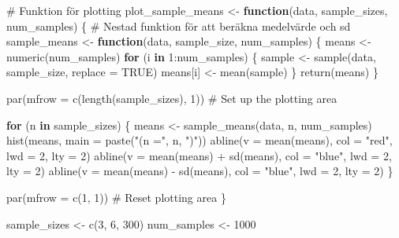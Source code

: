 \documentclass[
  letterpaper,
  DIV=11,
  numbers=noendperiod]{scrartcl}
\newenvironment{Shaded}{\begin{snugshade}}{\end{snugshade}}
\newcommand{\AttributeTok}[1]{\textcolor[rgb]{0.40,0.45,0.13}{#1}}
\newcommand{\CommentTok}[1]{\textcolor[rgb]{0.37,0.37,0.37}{#1}}
\newcommand{\ConstantTok}[1]{\textcolor[rgb]{0.56,0.35,0.01}{#1}}
\newcommand{\ControlFlowTok}[1]{\textcolor[rgb]{0.00,0.23,0.31}{\textbf{#1}}}
\newcommand{\DecValTok}[1]{\textcolor[rgb]{0.68,0.00,0.00}{#1}}
\newcommand{\FunctionTok}[1]{\textcolor[rgb]{0.28,0.35,0.67}{#1}}
\newcommand{\NormalTok}[1]{\textcolor[rgb]{0.00,0.23,0.31}{#1}}
\newcommand{\OtherTok}[1]{\textcolor[rgb]{0.00,0.23,0.31}{#1}}
\newcommand{\SpecialCharTok}[1]{\textcolor[rgb]{0.37,0.37,0.37}{#1}}
\newcommand{\StringTok}[1]{\textcolor[rgb]{0.13,0.47,0.30}{#1}}
\begin{document}
\begin{Shaded}
\begin{Highlighting}[]
\CommentTok{\# Funktion för plotting}
\NormalTok{plot\_sample\_means }\OtherTok{\textless{}{-}} \ControlFlowTok{function}\NormalTok{(data, sample\_sizes, num\_samples) \{}
  \CommentTok{\# Nestad funktion för att beräkna medelvärde och sd}
\NormalTok{  sample\_means }\OtherTok{\textless{}{-}} \ControlFlowTok{function}\NormalTok{(data, sample\_size, num\_samples) \{}
\NormalTok{    means }\OtherTok{\textless{}{-}} \FunctionTok{numeric}\NormalTok{(num\_samples)}
    \ControlFlowTok{for}\NormalTok{ (i }\ControlFlowTok{in} \DecValTok{1}\SpecialCharTok{:}\NormalTok{num\_samples) \{}
\NormalTok{      sample }\OtherTok{\textless{}{-}} \FunctionTok{sample}\NormalTok{(data, sample\_size, }\AttributeTok{replace =} \ConstantTok{TRUE}\NormalTok{)}
\NormalTok{      means[i] }\OtherTok{\textless{}{-}} \FunctionTok{mean}\NormalTok{(sample)}
\NormalTok{    \}}
    \FunctionTok{return}\NormalTok{(means)}
\NormalTok{  \}}
  
  \FunctionTok{par}\NormalTok{(}\AttributeTok{mfrow =} \FunctionTok{c}\NormalTok{(}\FunctionTok{length}\NormalTok{(sample\_sizes), }\DecValTok{1}\NormalTok{))  }\CommentTok{\# Set up the plotting area}
  
  \ControlFlowTok{for}\NormalTok{ (n }\ControlFlowTok{in}\NormalTok{ sample\_sizes) \{}
\NormalTok{    means }\OtherTok{\textless{}{-}} \FunctionTok{sample\_means}\NormalTok{(data, n, num\_samples)}
    \FunctionTok{hist}\NormalTok{(means, }\AttributeTok{main =} \FunctionTok{paste}\NormalTok{(}\StringTok{"(n ="}\NormalTok{, n, }\StringTok{")"}\NormalTok{))}
    \FunctionTok{abline}\NormalTok{(}\AttributeTok{v =} \FunctionTok{mean}\NormalTok{(means), }\AttributeTok{col =} \StringTok{"red"}\NormalTok{, }\AttributeTok{lwd =} \DecValTok{2}\NormalTok{, }\AttributeTok{lty =} \DecValTok{2}\NormalTok{)}
    \FunctionTok{abline}\NormalTok{(}\AttributeTok{v =} \FunctionTok{mean}\NormalTok{(means) }\SpecialCharTok{+} \FunctionTok{sd}\NormalTok{(means), }\AttributeTok{col =} \StringTok{"blue"}\NormalTok{, }\AttributeTok{lwd =} \DecValTok{2}\NormalTok{, }\AttributeTok{lty =} \DecValTok{2}\NormalTok{)}
    \FunctionTok{abline}\NormalTok{(}\AttributeTok{v =} \FunctionTok{mean}\NormalTok{(means) }\SpecialCharTok{{-}} \FunctionTok{sd}\NormalTok{(means), }\AttributeTok{col =} \StringTok{"blue"}\NormalTok{, }\AttributeTok{lwd =} \DecValTok{2}\NormalTok{, }\AttributeTok{lty =} \DecValTok{2}\NormalTok{)}
\NormalTok{  \}}
  
  \FunctionTok{par}\NormalTok{(}\AttributeTok{mfrow =} \FunctionTok{c}\NormalTok{(}\DecValTok{1}\NormalTok{, }\DecValTok{1}\NormalTok{))  }\CommentTok{\# Reset plotting area}
\NormalTok{\}}

\NormalTok{sample\_sizes }\OtherTok{\textless{}{-}} \FunctionTok{c}\NormalTok{(}\DecValTok{3}\NormalTok{, }\DecValTok{6}\NormalTok{, }\DecValTok{300}\NormalTok{)}
\NormalTok{num\_samples }\OtherTok{\textless{}{-}} \DecValTok{1000}
\end{Highlighting}
\end{Shaded}
\end{document}
